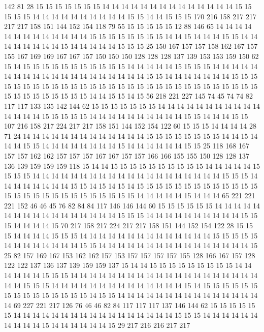 142 81 28 15 15 15 15 15 15 15 14 14 14 14 14 14 14 14 14 14
14 14 14 14 15 15 15 15 15 14 14 14 14 14 14 14 14 14 14 15
15 14 14 15 15 15 170 216 158 217 217 217 217 158 151 144 152 154 118 79
55 15 15 15 15 15 12 88 146 65 14 14 14 14 14 14 14 14 14 14
14 14 14 15 15 15 15 15 15 15 15 14 14 15 14 14 14 15 15 14
14 14 14 14 14 14 14 15 14 14 14 14 14 15 15 15 25 150 167 157
157 158 162 167 157 155 167 169 169 167 167 157 150 150 150 128 128 128 137 139
153 153 159 150 62 15 14 15 15 15 15 15 15 15 15 15 15 15 14 14
14 14 14 15 15 15 15 14 14 14 14 14 14 14 14 14 14 14 14 14
14 14 14 14 14 14 14 15 15 14 14 14 14 14 14 14 15 15 15 15
15 15 15 15 15 15 15 15 15 15 15 15 15 15 15 15 15 15 15 15
15 15 15 15 15 15 15 15 15 15 15 15 15 15 15 14 14 15 15 14
15 56 218 221 227 145 74 45 74 74 82 117 117 133 135 142 144 62 15 15
15 15 15 15 15 14 14 14 14 14 14 14 14 14 14 14 14 14 14 14
15 15 15 15 15 14 14 14 14 14 14 14 14 14 14 15 15 14 14 14
15 15 107 216 158 217 224 217 217 158 151 144 152 154 122 60 15 15 15 14
14 14 14 28 71 24 14 14 14 14 14 14 14 14 14 14 14 14 14 15
15 15 15 15 15 15 15 14 14 15 14 14 14 15 15 14 14 14 14 14
14 14 14 15 14 14 14 14 14 14 15 15 25 118 168 167 157 157 162 162
157 157 157 167 167 157 157 166 166 155 155 150 128 128 137 136 139 159 159 159
118 15 14 14 15 15 15 15 15 15 15 15 15 15 14 14 14 14 14 15
15 15 15 14 14 14 14 14 14 14 14 14 14 14 14 14 14 14 14 14
14 14 14 15 15 15 14 14 14 14 14 14 14 14 15 15 14 15 14 15
14 15 15 15 15 15 15 15 15 15 15 15 15 15 15 15 15 15 15 15
15 15 15 15 15 15 15 15 14 14 14 14 14 15 14 14 14 65 221 221
221 152 46 46 45 76 82 84 84 117 146 146 144 60 15 15 15 15 15 15
14 14 14 14 14 14 14 14 14 14 14 14 14 14 14 14 14 15 15 15
14 14 14 14 14 14 14 14 14 14 15 15 15 14 14 14 14 15 70 217
158 217 224 217 217 158 151 144 152 154 122 28 15 15 15 14 14 14 14 15
15 15 14 14 14 14 14 14 14 14 14 14 14 14 14 14 15 15 15 15
15 14 14 14 14 14 14 14 14 15 15 14 14 14 14 14 14 14 14 14
14 14 14 14 14 14 14 15 25 82 157 169 167 153 162 162 157 153 157 157
157 157 155 128 166 167 157 128 122 122 137 136 137 139 159 159 137 15 14 14
15 15 15 15 15 15 15 15 15 14 14 14 14 14 14 15 15 15 14 14
14 14 14 14 14 14 14 14 14 14 14 14 14 14 14 14 14 14 14 14
15 15 15 14 14 14 14 14 14 14 14 14 14 14 14 14 14 15 14 15
15 15 15 15 15 15 15 15 15 15 15 15 15 15 14 15 15 14 14 14
14 14 14 14 14 14 14 14 14 14 14 14 14 69 227 221 217 126 76 46
46 82 84 117 117 117 137 146 144 62 15 15 15 15 15 15 14 14 14 14
14 14 14 14 14 14 14 14 14 14 14 14 14 15 15 15 14 14 14 14
14 14 14 14 14 14 15 14 14 14 14 14 14 15 29 217 216 216 217 217
